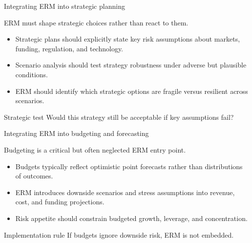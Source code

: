 \documentclass[aspectratio=169, 10pt]{beamer} %
\begin{document}
\begin{frame}{Integrating ERM into strategic planning}

ERM must shape strategic choices rather than react to them.

\medskip

\begin{itemize}
  \item[$\bullet$] Strategic plans should explicitly state key risk assumptions
  about markets, funding, regulation, and technology.

  \item[$\bullet$] Scenario analysis should test strategy robustness under
  adverse but plausible conditions.

  \item[$\bullet$] ERM should identify which strategic options are fragile
  versus resilient across scenarios.
\end{itemize}

\begin{block}{Strategic test}
Would this strategy still be acceptable if key assumptions fail?
\end{block}

\end{frame}


\begin{frame}{Integrating ERM into budgeting and forecasting}

Budgeting is a critical but often neglected ERM entry point.

\medskip

\begin{itemize}
  \item[$\bullet$] Budgets typically reflect optimistic point forecasts rather
  than distributions of outcomes.

  \item[$\bullet$] ERM introduces downside scenarios and stress assumptions
  into revenue, cost, and funding projections.

  \item[$\bullet$] Risk appetite should constrain budgeted growth, leverage,
  and concentration.
\end{itemize}

\begin{block}{Implementation rule}
If budgets ignore downside risk, ERM is not embedded.
\end{block}

\end{frame}
\end{document}
